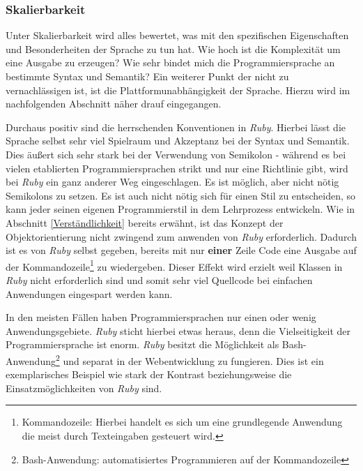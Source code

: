 \documentclass[12pt,DIV=14, version=first, BCOR=10mm,a4paper,twoside,parskip=half-,headsepline,headinclude]{scrartcl}
\begin{document}
\subsubsection{Skalierbarkeit}
\begin{flushleft}
Unter Skalierbarkeit wird alles bewertet, was mit den spezifischen Eigenschaften und Besonderheiten der Sprache zu tun hat. Wie hoch ist die Komplexität um eine Ausgabe zu erzeugen? Wie sehr bindet mich die Programmiersprache an bestimmte Syntax und Semantik? Ein weiterer Punkt der nicht zu vernachlässigen ist, ist die Plattformunabhängigkeit der Sprache. Hierzu wird im nachfolgenden Abschnitt näher drauf eingegangen.

Durchaus positiv sind die herrschenden Konventionen in \textit{\glqq Ruby\grqq}. Hierbei lässt die Sprache selbst sehr viel Spielraum und Akzeptanz bei der Syntax und Semantik. Dies äußert sich sehr stark bei der Verwendung von Semikolon - während es bei vielen etablierten Programmiersprachen strikt und nur eine Richtlinie gibt, wird bei \textit{\glqq Ruby\grqq} ein ganz anderer Weg eingeschlagen. Es ist möglich, aber nicht nötig Semikolons zu setzen. Es ist auch nicht nötig sich für einen Stil zu entscheiden, so kann jeder seinen eigenen Programmierstil in dem Lehrprozess entwickeln. Wie in Abschnitt \ref{Verständlichkeit} bereits erwähnt, ist das Konzept der Objektorientierung nicht zwingend zum anwenden von \textit{\glqq Ruby\grqq} erforderlich. Dadurch ist es von \textit{\glqq Ruby\grqq} selbst gegeben, bereits mit nur \textbf{einer} Zeile Code eine Ausgabe auf der Kommandozeile\footnote{\label{foot:2} {Kommandozeile: Hierbei handelt es sich um eine grundlegende Anwendung die meist durch Texteingaben gesteuert wird.}} zu wiedergeben. Dieser Effekt wird erzielt weil Klassen in \textit{\glqq Ruby\grqq} nicht erforderlich sind und somit sehr viel Quellcode bei einfachen Anwendungen eingespart werden kann.

In den meisten Fällen haben Programmiersprachen nur einen oder wenig Anwendungsgebiete. \textit{\glqq Ruby\grqq} sticht hierbei etwas heraus, denn die Vielseitigkeit der Programmiersprache ist enorm. \textit{\glqq Ruby\grqq} besitzt die Möglichkeit als Bash-Anwendung\footnote{\label{foot:3} {Bash-Anwendung: automatisiertes Programmieren auf der Kommandozeile}} und separat in der Webentwicklung zu fungieren. Dies ist ein exemplarisches Beispiel wie stark der Kontrast beziehungsweise die Einsatzmöglichkeiten von \textit{\glqq Ruby\grqq} sind. 


\end{flushleft}
\end{document}
